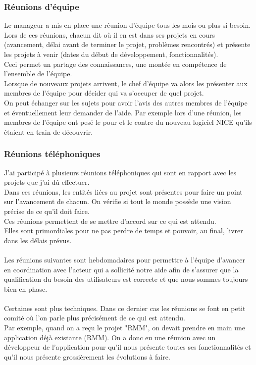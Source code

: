 \documentclass[a4paper,twoside,12pt,openright]{report}
\begin{document}
\subsubsection{Réunions d'équipe}
Le manageur a mis en place une réunion d’équipe tous les mois ou plus si besoin.\\ 
Lors de ces réunions, chacun dit où il en est dans ses projets en cours (avancement, délai avant de terminer le projet, problèmes rencontrés) et présente les projets à venir (dates du début de développement, fonctionnalités).\\
Ceci permet un partage des connaissances, une montée en compétence de l'ensemble de l'équipe.\\
Lorsque de nouveaux projets arrivent, le chef d'équipe va alors les présenter aux membres de l'équipe pour décider qui va s'occuper de quel projet.\\
On peut échanger sur les sujets pour avoir l'avis des autres membres de l'équipe et éventuellement leur demander de l'aide. Par exemple lors d'une réunion, les membres de l'équipe ont pesé le pour et le contre du nouveau logiciel NICE qu'ils étaient en train de découvrir.
\subsubsection{Réunions téléphoniques}
J’ai participé à plusieurs réunions téléphoniques qui sont en rapport avec les projets que j'ai dû effectuer.\\ 
Dans ces réunions, les entités liées au projet sont présentes pour faire un point sur l’avancement de chacun. On vérifie si tout le monde possède une vision précise de ce qu’il doit faire.\\
Ces réunions permettent de se mettre d’accord sur ce qui est attendu.\\ 
Elles sont primordiales pour ne pas perdre de temps et pouvoir, au final, livrer dans les délais prévus.\\\\
Les réunions suivantes sont hebdomadaires pour permettre à l’équipe d’avancer en coordination avec l’acteur qui a sollicité notre aide afin de s’assurer que la qualification du besoin des utilisateurs est correcte et que nous sommes toujours bien en phase.\\\\
Certaines sont plus techniques. Dans ce dernier cas les réunions se font en petit comité où l'on parle plus précisément de ce qui est attendu.\\
Par exemple, quand on a reçu le projet "RMM", on devait prendre en main une application déjà existante (RMM). On a donc eu une réunion avec un développeur de l’application pour qu’il nous présente toutes ses fonctionnalités et qu'il nous présente grossièrement les évolutions à faire.\\ 
\newpage
\end{document}
